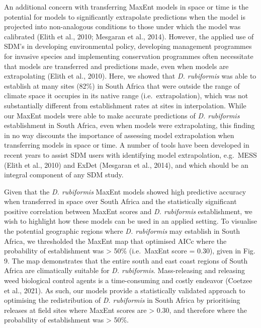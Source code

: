 \documentclass[12pt,]{article}
\begin{document}
An additional concern with transferring MaxEnt models in space or time
is the potential for models to significantly extrapolate predictions
when the model is projected into non-analogous conditions to those under
which the model was calibrated (Elith et al., 2010; Mesgaran et al.,
2014). However, the applied use of SDM's in developing environmental
policy, developing management programmes for invasive species and
implementing conservation programmes often necessitate that models are
transferred and predictions made, even when models are extrapolating
(Elith et al., 2010). Here, we showed that \emph{D. rubiformis} was able
to establish at many sites (82\%) in South Africa that were outside the
range of climate space it occupies in its native range
(i.e.~extrapolation), which was not substantially different from
establishment rates at sites in interpolation. While our MaxEnt models
were able to make accurate predictions of \emph{D. rubiformis}
establishment in South Africa, even when models were extrapolating, this
finding in no way discounts the importance of assessing model
extrapolation when transferring models in space or time. A number of
tools have been developed in recent years to assist SDM users with
identifying model extrapolation, e.g.~MESS (Elith et al., 2010) and
ExDet (Mesgaran et al., 2014), and which should be an integral component
of any SDM study.

Given that the \emph{D. rubiformis} MaxEnt models showed high predictive
accuracy when transferred in space over South Africa and the
statistically significant positive correlation between MaxEnt scores and
\emph{D. rubiformis} establishment, we wish to highlight how these
models can be used in an applied setting. To visualise the potential
geographic regions where \emph{D. rubiformis} may establish in South
Africa, we thresholded the MaxEnt map that optimised AICc where the
probability of establishment was \textgreater{} 50\% (i.e.~MaxEnt score
= 0.30), given in Fig. 9. The map demonstrates that the entire south and
east coast regions of South Africa are climatically suitable for
\emph{D. rubiformis}. Mass-releasing and releasing weed biological
control agents is a time-consuming and costly endeavor (Coetzee et al.,
2021). As such, our models provide a statistically validated approach to
optimising the redistribution of \emph{D. rubiformis} in South Africa by
prioritising releases at field sites where MaxEnt scores are
\textgreater{} 0.30, and therefore where the probability of
establishment was \textgreater{} 50\%.
\end{document}
